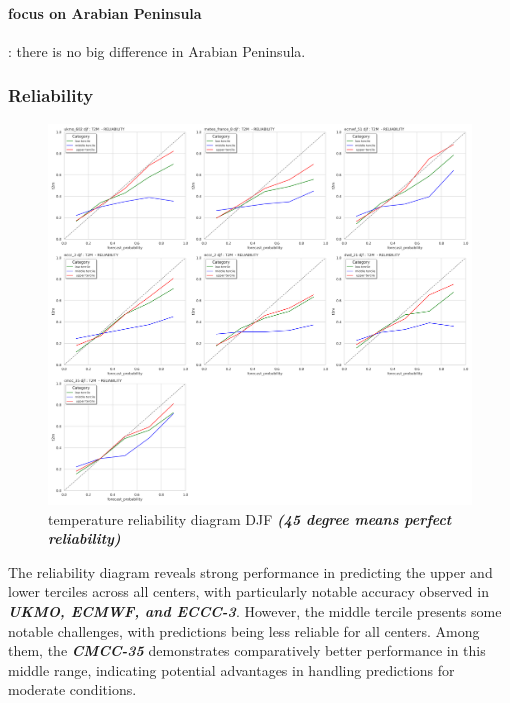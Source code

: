 \vspace{1.5cm}
\paragraph{focus on Arabian Peninsula}:
there is no big difference in Arabian Peninsula.

\subsubsection{Reliability}

\begin{figure}[H]
    \centering
    \includegraphics[width=1\linewidth]{plots/prob/rela/rela_diagram_djf_t2m.png}
    \caption{temperature reliability diagram DJF \textbf{\textit{(45 degree means perfect reliability)}}}
\end{figure}

The reliability diagram reveals strong performance in predicting the upper and lower terciles across all centers, with particularly notable accuracy observed in \textbf{\textit{UKMO, ECMWF, and ECCC-3}}. However, the middle tercile presents some notable challenges, with predictions being less reliable for all centers. Among them, the \textbf{\textit{CMCC-35}} demonstrates comparatively better performance in this middle range, indicating potential advantages in handling predictions for moderate conditions.

